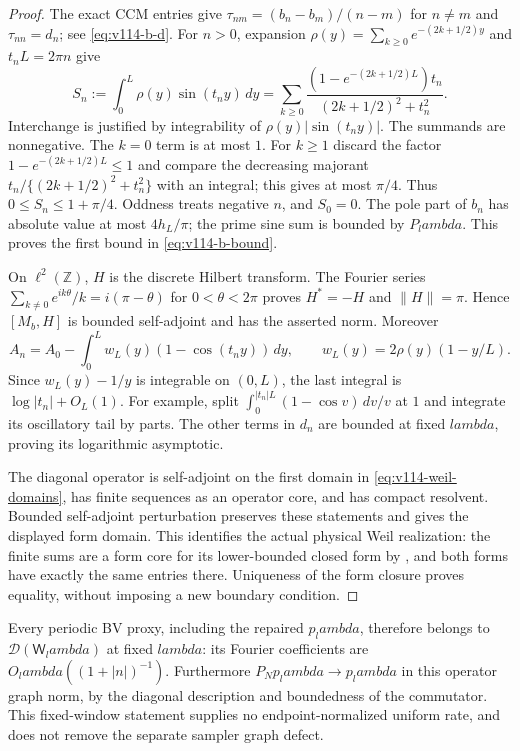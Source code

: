 \documentclass[11pt]{article}
\def\lambda{lambda}%
\theoremstyle{remark}
\begin{document}
\begin{proof}
The exact CCM entries give $\tau_{nm}=(b_n-b_m)/(n-m)$ for $n\ne m$
and $\tau_{nn}=d_n$; see \eqref{eq:v114-b-d}.
For $n>0$, expansion $\rho(y)=\sum_{k\ge0}e^{-(2k+1/2)y}$ and
$t_nL=2\pi n$ give
\[
 S_n:=\int_0^L\rho(y)\sin(t_ny)\,dy
 =\sum_{k\ge0}\frac{(1-e^{-(2k+1/2)L})t_n}
                         {(2k+1/2)^2+t_n^2}.
\]
Interchange is justified by integrability of
$\rho(y)|\sin(t_ny)|$. The summands are nonnegative. The $k=0$
term is at most $1$. For $k\ge1$ discard the factor
$1-e^{-(2k+1/2)L}\le1$ and compare the decreasing majorant
$t_n/\{(2k+1/2)^2+t_n^2\}$ with an integral; this gives at most
$\pi/4$. Thus
$0\le S_n\le1+\pi/4$. Oddness treats negative $n$, and $S_0=0$.
The pole part of $b_n$ has absolute value at most $4h_L/\pi$;
the prime sine sum is bounded by $P_\lambda$. This proves the first
bound in \eqref{eq:v114-b-bound}.

On $\ell^2(\mathbb Z)$, $H$ is the discrete Hilbert transform.
The Fourier series $\sum_{k\ne0}e^{ik\theta}/k=i(\pi-\theta)$
for $0<\theta<2\pi$ proves $H^*=-H$ and $\|H\|=\pi$.
Hence $[M_b,H]$ is bounded self-adjoint and has the asserted norm.
Moreover
\[
 A_n=A_0-\int_0^L w_L(y)(1-\cos(t_ny))\,dy,
 \qquad w_L(y)=2\rho(y)(1-y/L).
\]
Since $w_L(y)-1/y$ is integrable on $(0,L)$, the last integral is
$\log|t_n|+O_L(1)$. For example, split
$\int_0^{|t_n|L}(1-\cos v)\,dv/v$ at $1$ and integrate its
oscillatory tail by parts. The other terms in $d_n$ are bounded at
fixed $\lambda$, proving its logarithmic asymptotic.

The diagonal operator is self-adjoint on the first domain in
\eqref{eq:v114-weil-domains}, has finite sequences as an operator
core, and has compact resolvent. Bounded self-adjoint perturbation
preserves these statements and gives the displayed form domain.
This identifies the actual physical Weil realization: the finite sums
are a form core for its lower-bounded closed form by
\cite[Propositions~3.2--3.4]{ConnesConsaniMoscovici2025}, and both
forms have exactly the same entries there. Uniqueness of the form
closure proves equality, without imposing a new boundary condition.
\end{proof}

Every periodic BV proxy, including the repaired $p_\lambda$, therefore
belongs to $\mathcal D(\mathsf W_\lambda)$ at fixed $\lambda$:
its Fourier coefficients are $O_\lambda((1+|n|)^{-1})$.
Furthermore $P_Np_\lambda\to p_\lambda$ in this operator graph norm,
by the diagonal description and boundedness of the commutator. This
fixed-window statement supplies no endpoint-normalized uniform rate,
and does not remove the separate sampler graph defect.
\end{document}
